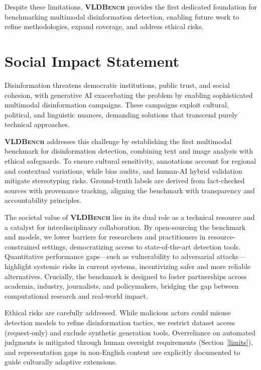 Despite these limitations, \textsf{\textbf{\textsc{VLDBench}}} provides the first dedicated foundation for benchmarking multimodal disinformation detection, enabling future work to refine methodologies, expand coverage, and address ethical risks.

\section*{Social Impact Statement}
\label{sec:social-impact }

Disinformation threatens democratic institutions, public trust, and social cohesion, with generative AI exacerbating the problem by enabling sophisticated multimodal disinformation campaigns. These campaigns exploit cultural, political, and linguistic nuances, demanding solutions that transcend purely technical approaches.

\textsf{\textbf{\textsc{VLDBench}}} addresses this challenge by establishing the first multimodal benchmark for disinformation detection, combining text and image analysis with ethical safeguards. To ensure cultural sensitivity, annotations account for regional and contextual variations, while bias audits, and human-AI hybrid validation mitigate stereotyping risks. Ground-truth labels are derived from fact-checked sources with provenance tracking, aligning the benchmark with transparency and accountability principles.

The societal value of \textsf{\textbf{\textsc{VLDBench}}} lies in its dual role as a technical resource and a catalyst for interdisciplinary collaboration. By open-sourcing the benchmark and models, we lower barriers for researchers and practitioners in resource-constrained settings, democratizing access to state-of-the-art detection tools. Quantitative performance gaps—such as vulnerability to adversarial attacks—highlight systemic risks in current systems, incentivizing safer and more reliable alternatives. Crucially, the benchmark is designed to foster partnerships across academia, industry, journalists, and policymakers, bridging the gap between computational research and real-world impact.

Ethical risks are carefully addressed. While malicious actors could misuse detection models to refine disinformation tactics, we restrict dataset access (request-only) and exclude synthetic generation tools. Overreliance on automated judgments is mitigated through human oversight requirements (Section~\ref{limits}), and representation gaps in non-English content are explicitly documented to guide culturally adaptive extensions.

